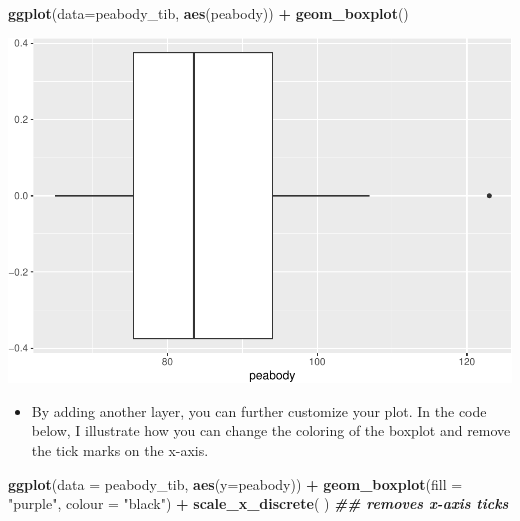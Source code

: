 \documentclass[
]{book}
\newenvironment{Shaded}{\begin{snugshade}}{\end{snugshade}}
\newcommand{\AttributeTok}[1]{\textcolor[rgb]{0.13,0.29,0.53}{#1}}
\newcommand{\DocumentationTok}[1]{\textcolor[rgb]{0.56,0.35,0.01}{\textbf{\textit{#1}}}}
\newcommand{\FunctionTok}[1]{\textcolor[rgb]{0.13,0.29,0.53}{\textbf{#1}}}
\newcommand{\NormalTok}[1]{#1}
\newcommand{\SpecialCharTok}[1]{\textcolor[rgb]{0.81,0.36,0.00}{\textbf{#1}}}
\newcommand{\StringTok}[1]{\textcolor[rgb]{0.31,0.60,0.02}{#1}}
\providecommand{\tightlist}{%
  \setlength{\itemsep}{0pt}\setlength{\parskip}{0pt}}
\begin{document}
\begin{Shaded}
\begin{Highlighting}[]
\FunctionTok{ggplot}\NormalTok{(}\AttributeTok{data=}\NormalTok{peabody\_tib, }\FunctionTok{aes}\NormalTok{(peabody)) }\SpecialCharTok{+}
  \FunctionTok{geom\_boxplot}\NormalTok{()}
\end{Highlighting}
\end{Shaded}

\includegraphics{PSY202A-Modeling-I.Heo_files/figure-latex/unnamed-chunk-72-1.pdf}

\begin{itemize}
\tightlist
\item
  By adding another layer, you can further customize your plot. In the code below, I illustrate how you can change the coloring of the boxplot and remove the tick marks on the x-axis.
\end{itemize}

\begin{Shaded}
\begin{Highlighting}[]
\FunctionTok{ggplot}\NormalTok{(}\AttributeTok{data =}\NormalTok{ peabody\_tib, }\FunctionTok{aes}\NormalTok{(}\AttributeTok{y=}\NormalTok{peabody)) }\SpecialCharTok{+}
  \FunctionTok{geom\_boxplot}\NormalTok{(}\AttributeTok{fill =} \StringTok{"purple"}\NormalTok{, }\AttributeTok{colour =} \StringTok{"black"}\NormalTok{) }\SpecialCharTok{+}
  \FunctionTok{scale\_x\_discrete}\NormalTok{( ) }\DocumentationTok{\#\# removes x{-}axis ticks}
\end{Highlighting}
\end{Shaded}
\end{document}
